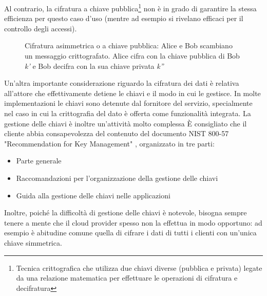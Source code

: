 \documentclass[../main.tex]{subfiles}
\begin{document}
Al contrario, la cifratura a chiave pubblica\footnote{Tecnica crittografica che utilizza due chiavi diverse (pubblica e privata) legate da una relazione matematica per effettuare le operazioni di cifratura e decifratura} non è in grado di garantire la stessa efficienza per questo caso d'uso \cite{CloudSecurityBook} (mentre ad esempio si rivelano efficaci per il controllo degli accessi).

\begin{figure}[H]
\centering
{}
\caption[Cifratura asimmetrica o a chiave pubblica]{Cifratura asimmetrica o a chiave pubblica: Alice e Bob scambiano un messaggio crittografato. Alice cifra con la chiave pubblica di Bob \textit{k'} e Bob decifra con la sua chiave privata \textit{k''}}\label{fig:cifraturaasimmetrica}
\end{figure}

Un'altra importante considerazione riguardo la cifratura dei dati è relativa all'attore che effettivamente detiene le chiavi e il modo in cui le gestisce. In molte implementazioni le chiavi sono detenute dal fornitore del servizio, specialmente nel caso in cui la crittografia del dato è offerta come funzionalità integrata.
La gestione delle chiavi è inoltre un'attività molto complessa
\`E consigliato che il cliente abbia consapevolezza del contenuto del documento NIST 800-57 "Recommendation for Key Management" \cite{NISTKeys}, organizzato in tre parti: \cite{CloudSecurityBook}
\begin{itemize}
\item Parte generale
\item Raccomandazioni per l'organizzazione della gestione delle chiavi
\item Guida alla gestione delle chiavi nelle applicazioni
\end{itemize}
Inoltre, poiché la difficoltà di gestione delle chiavi è notevole, bisogna sempre tenere a mente che il cloud provider spesso non la effettua in modo opportuno: ad esempio è abitudine comune quella di cifrare i dati di tutti i clienti con un'unica chiave simmetrica.
\end{document}
